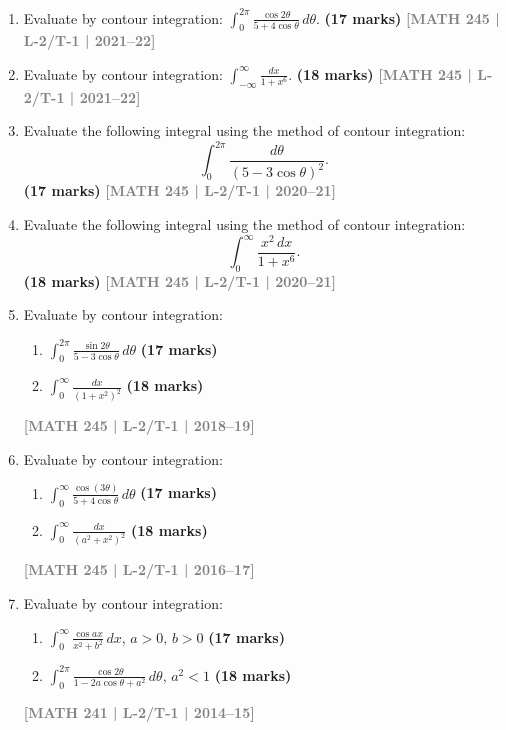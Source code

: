 \documentclass[12pt,a4paper]{article}
\newcommand{\yr}[1]{\hfill\textcolor{gray}{\small\textbf{[#1]}}}
\newcommand{\mk}[1]{\textcolor{orange!70!black}{\small\textbf{(#1 marks)}}}
\begin{document}
\begin{enumerate}\item Evaluate by contour integration: $\displaystyle\int_{0}^{2\pi}\frac{\cos 2\theta}{5+4\cos\theta}\,d\theta$.
\mk{17} \yr{MATH 245 | L-2/T-1 | 2021--22}

\item Evaluate by contour integration: $\displaystyle\int_{-\infty}^{\infty}\frac{dx}{1+x^{6}}$.
\mk{18} \yr{MATH 245 | L-2/T-1 | 2021--22} 

\item Evaluate the following integral using the method of contour integration:
\[
\int_{0}^{2\pi} \frac{d\theta}{(5-3\cos\theta)^{2}}.
\]
\mk{17} \yr{MATH 245 | L-2/T-1 | 2020--21}

\item Evaluate the following integral using the method of contour integration:
\[
\int_{0}^{\infty} \frac{x^{2}\,dx}{1+x^{6}}.
\]
\mk{18} \yr{MATH 245 | L-2/T-1 | 2020--21}

\item Evaluate by contour integration:
\begin{enumerate}
  \item $\displaystyle\int_{0}^{2\pi}\frac{\sin 2\theta}{5-3\cos\theta}\,d\theta$ \mk{17}
  \item $\displaystyle\int_{0}^{\infty}\frac{dx}{(1+x^{2})^{2}}$ \mk{18}
\end{enumerate}
\yr{MATH 245 | L-2/T-1 | 2018--19}

\item Evaluate by contour integration:
\begin{enumerate}
  \item $\displaystyle\int_{0}^{\infty}\frac{\cos(3\theta)}{5+4\cos\theta}\,d\theta$ \mk{17}
  \item $\displaystyle\int_{0}^{\infty}\frac{dx}{(a^{2}+x^{2})^{2}}$ \mk{18}
\end{enumerate}
\yr{MATH 245 | L-2/T-1 | 2016--17}

\item Evaluate by contour integration:
\begin{enumerate}
  \item $\displaystyle\int_{0}^{\infty}\frac{\cos ax}{x^{2}+b^{2}}\,dx$, \quad $a>0,\,b>0$ \mk{17}
  \item $\displaystyle\int_{0}^{2\pi}\frac{\cos 2\theta}{1-2a\cos\theta+a^{2}}\,d\theta$, \quad $a^{2}<1$ \mk{18}
\end{enumerate}
\yr{MATH 241 | L-2/T-1 | 2014--15}


\end{enumerate}
\end{document}

